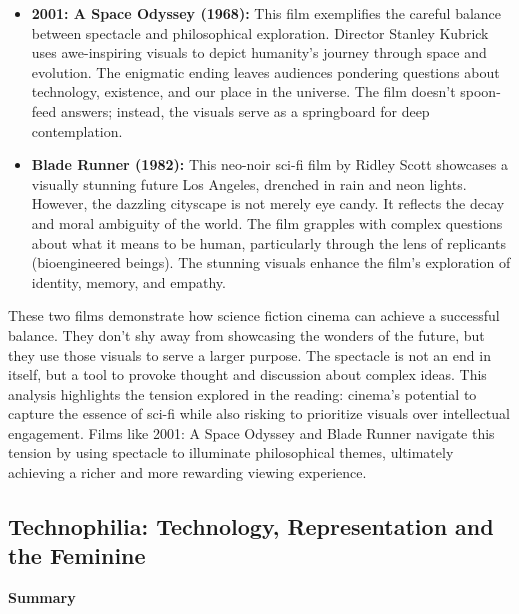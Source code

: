 \documentclass[11pt,fleqn]{book} %
\begin{document}
\begin{itemize}
\item \textbf{2001: A Space Odyssey (1968):} This film exemplifies the careful balance between spectacle and philosophical exploration. Director Stanley Kubrick uses awe-inspiring visuals  to depict humanity's journey through space and evolution. The enigmatic ending leaves audiences pondering questions about  technology, existence, and our place in the universe. The film doesn't spoon-feed answers; instead, the visuals serve as a springboard for deep contemplation. 

\item \textbf{Blade Runner (1982):} This neo-noir sci-fi film by Ridley Scott  showcases a visually stunning future Los Angeles, drenched in rain and neon lights. However, the dazzling cityscape is not merely eye candy. It reflects the decay and moral ambiguity of the world. The film grapples with complex questions about  what it means to be human, particularly through the lens of replicants (bioengineered beings). The stunning visuals enhance the film's exploration of identity, memory, and empathy. 
\end{itemize}
\vspace{5pt}
These two films demonstrate how science fiction cinema can achieve  a successful balance. They don't shy away from  showcasing  the wonders of the future, but they use those visuals to serve a larger purpose. The spectacle is not an end in itself, but a tool to  provoke thought and discussion about complex ideas. This analysis highlights the tension  explored in the reading: cinema's potential to capture the essence of sci-fi while also  risking  to prioritize visuals over intellectual engagement. Films like 2001: A Space Odyssey and Blade Runner navigate this tension  by using spectacle to  illuminate  philosophical themes,  ultimately achieving a richer and more rewarding viewing experience. 

\subsection{Technophilia: Technology, Representation and the Feminine }
\textbf{Summary}
\end{document}
